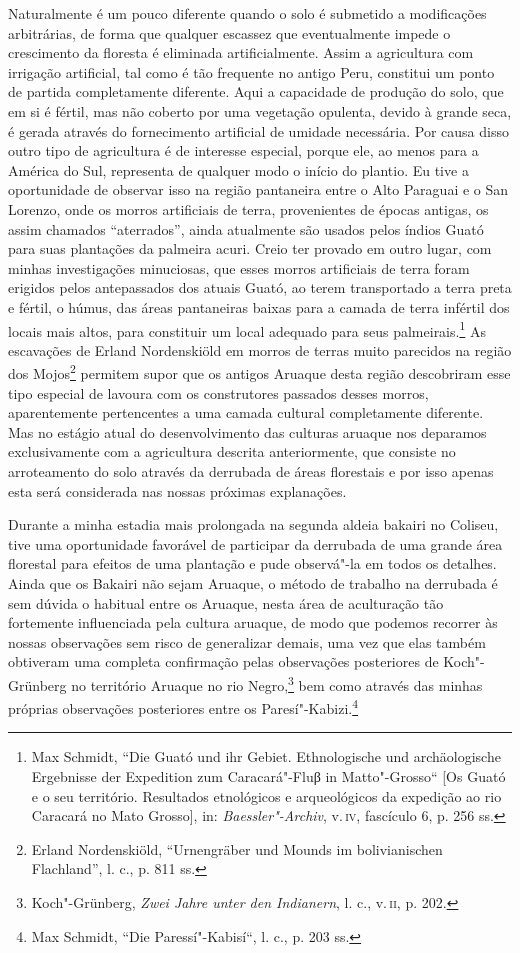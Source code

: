 Naturalmente é um pouco diferente quando o solo é submetido a
modificações arbitrárias, de forma que qualquer escassez que
eventualmente impede o crescimento da floresta é eliminada
artificialmente. Assim a agricultura com irrigação artificial, tal como
é tão frequente no antigo Peru, constitui um ponto de partida
completamente diferente. Aqui a capacidade de produção do solo, que em
si é fértil, mas não coberto por uma vegetação opulenta, devido à grande
seca, é gerada através do fornecimento artificial de umidade necessária.
Por causa disso outro tipo de agricultura é de interesse especial,
porque ele, ao menos para a América do Sul, representa de qualquer modo
o início do plantio. Eu tive a oportunidade de observar isso na região
pantaneira entre o Alto Paraguai e o San Lorenzo, onde os morros
artificiais de terra, provenientes de épocas antigas, os assim chamados
``aterrados'', ainda atualmente são usados pelos índios Guató para suas
plantações da palmeira acuri. Creio ter provado em outro lugar, com
minhas investigações minuciosas, que esses morros artificiais de terra
foram erigidos pelos antepassados dos atuais Guató, ao terem
transportado a terra preta e fértil, o húmus, das áreas pantaneiras
baixas para a camada de terra infértil dos locais mais altos, para
constituir um local adequado para seus palmeirais.\footnote{Max Schmidt,
  ``Die Guató und ihr Gebiet. Ethnologische und archäologische
  Ergebnisse der Expedition zum Caracará"-Fluβ in Matto"-Grosso`` {[}Os
  Guató e o seu território. Resultados etnológicos e arqueológicos da
  expedição ao rio Caracará no Mato Grosso{]}, in:
  \emph{Baessler"-Archiv}, v.\,\textsc{iv}, fascículo 6, p. 256 ss.} As escavações
de Erland Nordenskiöld em morros de terras muito parecidos na região dos
Mojos\footnote{Erland Nordenskiöld, ``Urnengräber und Mounds im
  bolivianischen Flachland'', l. c., p. 811 ss.} permitem supor que os
antigos Aruaque desta região descobriram esse tipo especial de lavoura
com os construtores passados desses morros, aparentemente pertencentes
a uma camada cultural completamente diferente. Mas no estágio atual do
desenvolvimento das culturas aruaque nos deparamos exclusivamente com a
agricultura descrita anteriormente, que consiste no arroteamento do solo
através da derrubada de áreas florestais e por isso apenas esta será
considerada nas nossas próximas explanações.

Durante a minha estadia mais prolongada na segunda aldeia bakairi no
Coliseu, tive uma oportunidade favorável de participar da derrubada de
uma grande área florestal para efeitos de uma plantação e pude
observá"-la em todos os detalhes. Ainda que os Bakairi não sejam Aruaque,
o método de trabalho na derrubada é sem dúvida o habitual entre os
Aruaque, nesta área de aculturação tão fortemente influenciada pela
cultura aruaque, de modo que podemos recorrer às nossas observações sem
risco de generalizar demais, uma vez que elas também obtiveram uma
completa confirmação pelas observações posteriores de Koch"-Grünberg no
território Aruaque no rio Negro,\footnote{Koch"-Grünberg, \emph{Zwei Jahre
  unter den Indianern}, l. c., v.\,\textsc{ii}, p. 202.} bem como através das
minhas próprias observações posteriores entre os Paresí"-Kabizi.\footnote{Max
  Schmidt, ``Die Paressí"-Kabisí``, l. c., p. 203 ss.}

